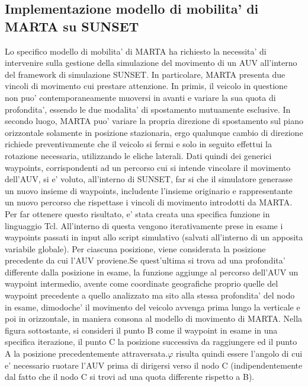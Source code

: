 \subsection{Implementazione modello di mobilita' di MARTA su SUNSET}
Lo specifico modello di mobilita' di MARTA ha richiesto la necessita' di intervenire sulla gestione della simulazione del movimento di un AUV all'interno del framework di simulazione SUNSET. \newline In particolare, MARTA presenta due vincoli di movimento cui prestare attenzione. In primis, il veicolo in questione non puo' contemporaneamente muoversi in avanti e variare la sua quota di profondita', essendo le due modalita' di spostamento mutuamente esclusive. \newline In secondo luogo, MARTA puo' variare la propria direzione di spostamento sul piano orizzontale solamente in posizione stazionaria, ergo qualunque cambio di direzione richiede preventivamente che il veicolo si fermi e solo in seguito effettui la rotazione necessaria, utilizzando le eliche laterali. \newline
Dati quindi dei generici waypoints, corrispondenti ad un percorso cui si intende vincolare il movimento dell'AUV, si e' voluto, all'interno di SUNSET, far si che il simulatore generasse un nuovo insieme di waypoints, includente l'insieme originario e rappresentante un nuovo percorso che rispettase  i vincoli di movimento introdotti da MARTA. \newline Per far ottenere questo risultato, e' stata creata una specifica funzione in linguaggio Tcl. \newline All'interno di questa vengono iterativamente prese in esame i waypoints passati in input allo script simulativo (salvati all'interno di un apposita variabile globale). \newline Per ciascuna posizione, viene considerata la posizione precedente da cui l'AUV proviene.\newline Se quest'ultima si trova ad una profondita' differente dalla posizione in esame, la funzione aggiunge al percorso dell'AUV un waypoint intermedio, avente come coordinate geografiche proprio quelle del waypoint precedente a quello analizzato ma sito alla stessa profondita' del nodo in esame, dimodoche' il movimento del veicolo avvenga prima lungo la verticale e poi in orizzontale, in maniera consona al modello di movimento di MARTA.\newline
Nella figura sottostante, si consideri il punto B come il waypoint in esame in una specifica iterazione, il punto C la posizione successiva da raggiungere ed il punto A la posizione precedentemente attraversata.\newline $\varphi$  risulta quindi essere l'angolo di cui e' necessario ruotare l'AUV prima di dirigersi verso il nodo C (indipendentemente dal fatto che il nodo C si trovi ad una quota differente rispetto a B). 

